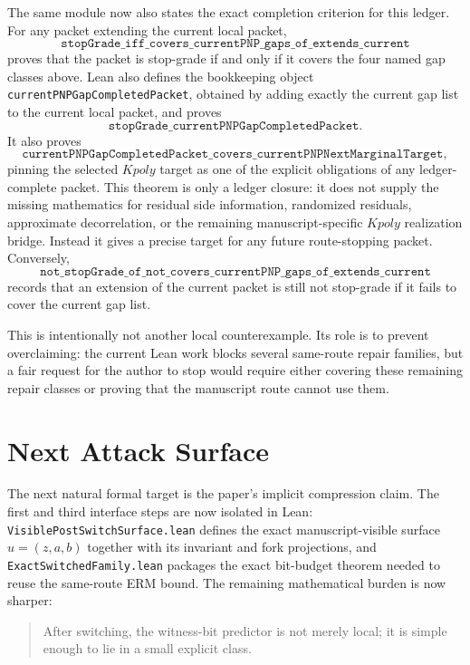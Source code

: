 \documentclass[11pt]{article}
\theoremstyle{remark}
\begin{document}
The same module now also states the exact completion criterion for this ledger.
For any packet extending the current local packet,
\[
  \texttt{stopGrade\_iff\_covers\_currentPNP\_gaps\_of\_extends\_current}
\]
proves that the packet is stop-grade if and only if it covers the four named
gap classes above.  Lean also defines the bookkeeping object
\texttt{currentPNPGapCompletedPacket}, obtained by adding exactly the current
gap list to the current local packet, and proves
\[
  \texttt{stopGrade\_currentPNPGapCompletedPacket}.
\]
It also proves
\[
  \texttt{currentPNPGapCompletedPacket\_covers\_currentPNPNextMarginalTarget},
\]
pinning the selected \(Kpoly\) target as one of the explicit obligations of any
ledger-complete packet.
This theorem is only a ledger closure: it does not supply the missing
mathematics for residual side information, randomized residuals, approximate
decorrelation, or the remaining manuscript-specific \(Kpoly\) realization
bridge.  Instead it gives a precise
target for any future route-stopping packet.
Conversely,
\[
  \texttt{not\_stopGrade\_of\_not\_covers\_currentPNP\_gaps\_of\_extends\_current}
\]
records that an extension of the current packet is still not stop-grade if it
fails to cover the current gap list.

This is intentionally not another local counterexample.  Its role is to prevent
overclaiming: the current Lean work blocks several same-route repair families,
but a fair request for the author to stop would require either covering these
remaining repair classes or proving that the manuscript route cannot use them.

\section{Next Attack Surface}

The next natural formal target is the paper's implicit compression claim.  The
first and third interface steps are now isolated in Lean:
\texttt{VisiblePostSwitchSurface.lean} defines the exact manuscript-visible
surface \(u=(z,a,b)\) together with its invariant and fork projections, and
\texttt{ExactSwitchedFamily.lean} packages the exact bit-budget theorem needed
to reuse the same-route ERM bound.  The remaining mathematical burden is now
sharper:

\begin{quote}
After switching, the witness-bit predictor is not merely local; it is simple enough to lie in a
small explicit class.
\end{quote}
\end{document}
